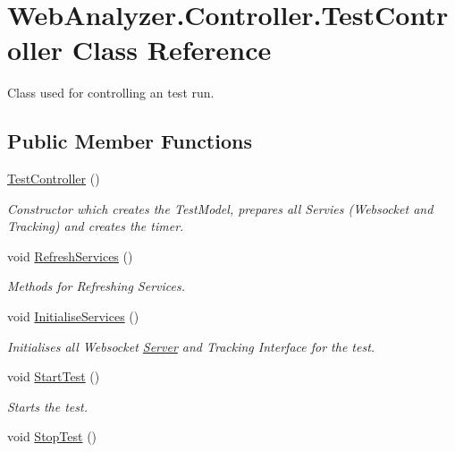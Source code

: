 \hypertarget{class_web_analyzer_1_1_controller_1_1_test_controller}{}\section{Web\+Analyzer.\+Controller.\+Test\+Controller Class Reference}
\label{class_web_analyzer_1_1_controller_1_1_test_controller}


Class used for controlling an test run.  


\subsection*{Public Member Functions}
\begin{DoxyCompactItemize}
\item 
\hyperlink{class_web_analyzer_1_1_controller_1_1_test_controller_acac996dad8f9c1f9890263f82df9593a}{Test\+Controller} ()
\begin{DoxyCompactList}\small\item\em Constructor which creates the Test\+Model, prepares all Servies (Websocket and Tracking) and creates the timer. \end{DoxyCompactList}\item 
void \hyperlink{class_web_analyzer_1_1_controller_1_1_test_controller_a7074ca580c48782cb944d4cde6bbe26e}{Refresh\+Services} ()
\begin{DoxyCompactList}\small\item\em Methods for Refreshing Services. \end{DoxyCompactList}\item 
void \hyperlink{class_web_analyzer_1_1_controller_1_1_test_controller_a3ca8d6304b4b53fa226ab5f23c6aeba5}{Initialise\+Services} ()
\begin{DoxyCompactList}\small\item\em Initialises all Websocket \hyperlink{namespace_web_analyzer_1_1_server}{Server} and Tracking Interface for the test. \end{DoxyCompactList}\item 
void \hyperlink{class_web_analyzer_1_1_controller_1_1_test_controller_a2c41ced530712abfceaab3cea7f6bbac}{Start\+Test} ()
\begin{DoxyCompactList}\small\item\em Starts the test. \end{DoxyCompactList}\item 
void \hyperlink{class_web_analyzer_1_1_controller_1_1_test_controller_a6ebdcf138dc6c394c8a5695da1f8de23}{Stop\+Test} ()

\end{DoxyCompactItemize}
